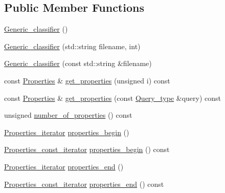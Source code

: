 \subsection*{Public Member Functions}
\begin{DoxyCompactItemize}
\item 
\hyperlink{structESBTL_1_1Generic__classifier_a5d56e509b7af3a5fe94e4e737de4eea8}{Generic\+\_\+classifier} ()
\item 
\hyperlink{structESBTL_1_1Generic__classifier_a9e7fad423ff513e510626ac3a7a9c666}{Generic\+\_\+classifier} (std\+::string filename, int)
\item 
\hyperlink{structESBTL_1_1Generic__classifier_adc911aefb50341cdb6e31cea019cdc5c}{Generic\+\_\+classifier} (const std\+::string \&filename)
\item 
const \hyperlink{structESBTL_1_1Generic__classifier_aef70ade88efad6f1819bfd389b925ac9}{Properties} \& \hyperlink{structESBTL_1_1Generic__classifier_a2801becec2140ba68038dc7adbd513b2}{get\+\_\+properties} (unsigned i) const
\item 
const \hyperlink{structESBTL_1_1Generic__classifier_aef70ade88efad6f1819bfd389b925ac9}{Properties} \& \hyperlink{structESBTL_1_1Generic__classifier_a8cf60fa688b352634428b688fe776ef8}{get\+\_\+properties} (const \hyperlink{structESBTL_1_1Generic__classifier_af7772b010c028daaec09d6a3f556894d}{Query\+\_\+type} \&query) const
\item 
unsigned \hyperlink{structESBTL_1_1Generic__classifier_a1ce2e54d7c1a2c2b8a088457e2c631fb}{number\+\_\+of\+\_\+properties} () const
\item 
\hyperlink{structESBTL_1_1Generic__classifier_a5f82ff1a1ee75714d393ded0c3824fe6}{Properties\+\_\+iterator} \hyperlink{structESBTL_1_1Generic__classifier_a1ed70ae31493dc92cfec60b4642443f7}{properties\+\_\+begin} ()
\item 
\hyperlink{structESBTL_1_1Generic__classifier_aa2bfed4b529df9cbc252bacf20a15174}{Properties\+\_\+const\+\_\+iterator} \hyperlink{structESBTL_1_1Generic__classifier_a2a81b08a15d82ae5b4cd572e51d6ef64}{properties\+\_\+begin} () const
\item 
\hyperlink{structESBTL_1_1Generic__classifier_a5f82ff1a1ee75714d393ded0c3824fe6}{Properties\+\_\+iterator} \hyperlink{structESBTL_1_1Generic__classifier_aa0a9cd5820b85da21d898b6bd2bdb2ae}{properties\+\_\+end} ()
\item 
\hyperlink{structESBTL_1_1Generic__classifier_aa2bfed4b529df9cbc252bacf20a15174}{Properties\+\_\+const\+\_\+iterator} \hyperlink{structESBTL_1_1Generic__classifier_a384420a9e0c6c96e2091fbfd825c4c6a}{properties\+\_\+end} () const
\end{DoxyCompactItemize}


